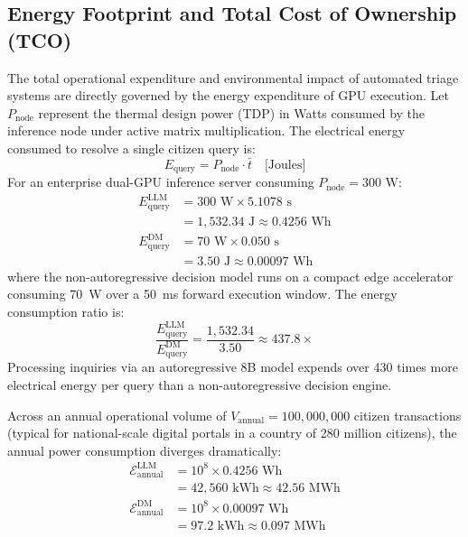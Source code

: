 \documentclass[journal,compsoc]{IEEEtran}
\begin{document}
\subsection{Energy Footprint and Total Cost of Ownership (TCO)}
The total operational expenditure and environmental impact of automated triage systems are directly governed by the energy expenditure of GPU execution. Let $P_{\text{node}}$ represent the thermal design power (TDP) in Watts consumed by the inference node under active matrix multiplication. The electrical energy consumed to resolve a single citizen query is:
\begin{equation}
E_{\text{query}} = P_{\text{node}} \cdot \bar{t} \quad \text{[Joules]}
\end{equation}
For an enterprise dual-GPU inference server consuming $P_{\text{node}} = 300 \text{ W}$:
\begin{align}
E_{\text{query}}^{\text{LLM}} &= 300 \text{ W} \times 5.1078 \text{ s} \nonumber \\
&= 1,532.34 \text{ J} \approx 0.4256 \text{ Wh} \\
E_{\text{query}}^{\text{DM}} &= 70 \text{ W} \times 0.050 \text{ s} \nonumber \\
&= 3.50 \text{ J} \approx 0.00097 \text{ Wh}
\end{align}
where the non-autoregressive decision model runs on a compact edge accelerator consuming 70~W over a 50~ms forward execution window. The energy consumption ratio is:
\begin{equation}
\frac{E_{\text{query}}^{\text{LLM}}}{E_{\text{query}}^{\text{DM}}} = \frac{1,532.34}{3.50} \approx 437.8 \times
\end{equation}
Processing inquiries via an autoregressive 8B model expends over 430 times more electrical energy per query than a non-autoregressive decision engine.

Across an annual operational volume of $V_{\text{annual}} = 100{,}000{,}000$ citizen transactions (typical for national-scale digital portals in a country of 280 million citizens), the annual power consumption diverges dramatically:
\begin{equation}
\begin{aligned}
\mathcal{E}_{\text{annual}}^{\text{LLM}} &= 10^8 \times 0.4256 \text{ Wh} \\
&= 42,560 \text{ kWh} \approx 42.56 \text{ MWh} \\
\mathcal{E}_{\text{annual}}^{\text{DM}} &= 10^8 \times 0.00097 \text{ Wh} \\
&= 97.2 \text{ kWh} \approx 0.097 \text{ MWh}
\end{aligned}
\end{equation}
\end{document}
